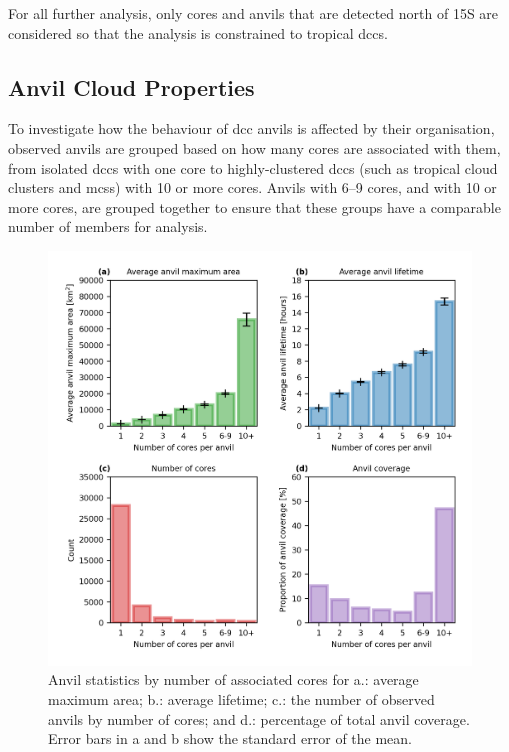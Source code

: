 For all further analysis, only cores and anvils that are detected north of 15\textdegree S are considered so that the analysis is constrained to tropical \acrshort{dcc}s.

\subsection{Anvil Cloud Properties}

To investigate how the behaviour of \acrshort{dcc} anvils is affected by their organisation, observed anvils are grouped based on how many cores are associated with them, from isolated \acrshort{dcc}s with one core to highly-clustered \acrshort{dcc}s (such as tropical cloud clusters and \acrshort{mcs}s) with 10 or more cores. 
Anvils with 6--9 cores, and with 10 or more cores, are grouped together to ensure that these groups have a comparable number of members for analysis.

\begin{figure}[tp]
    \includegraphics[width=\textwidth]{figures/chapter4_09.png}
    \caption[
    Anvil statistics by number of associated cores for average maximum area, average lifetime, occurrence of anvils by number of cores, and percentage of total anvil coverage
    ]{
    Anvil statistics by number of associated cores for a.: average maximum area; b.: average lifetime; c.: the number of observed anvils by number of cores; and d.: percentage of total anvil coverage. Error bars in a and b show the standard error of the mean.
    }
    \label{fig:seviri_anvil_stats}
\end{figure}

